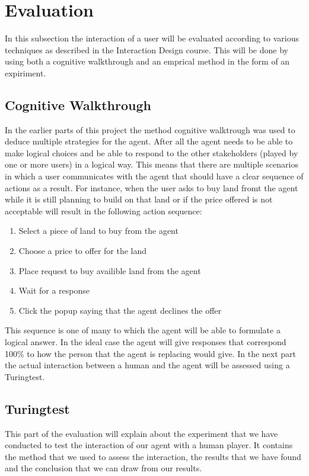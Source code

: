 \section{Evaluation}
In this subsection the interaction of a user will be evaluated according to various techniques as described in the Interaction Design course. This will be done by using both a cognitive walkthrough and an emprical method in the form of an expiriment.

\subsection{Cognitive Walkthrough}

In the earlier parts of this project the method cognitive walktrough was used to deduce multiple strategies for the agent. After all the agent needs to be able to make logical choices and be able to respond to the other stakeholders (played by one or more users) in a logical way. This means that there are multiple scenarios in which a user communicates with the agent that should have a clear sequence of actions as a result. For instance, when the user asks to buy land fromt the agent while it is still planning to build on that land or if the price offered is not acceptable will result in the following action sequence: 
\begin{enumerate}
\item Select a piece of land to buy from the agent
\item Choose a price to offer for the land
\item Place request to buy availible land from the agent
\item Wait for a response
\item Click the popup saying that the agent declines the offer
\end{enumerate}

This sequence is one of many to which the agent will be able to formulate a logical answer. In the ideal case the agent will give responses that correspond 100\% to how the person that the agent is replacing would give. In the next part the actual interaction between a human and the agent will be assessed using a Turingtest.

\subsection{Turingtest}
This part of the evaluation will explain about the experiment that we have conducted to test the interaction of our agent with a human player. It contains the method that we used to assess the interaction, the results that we have found and the conclusion that we can draw from our results. 

